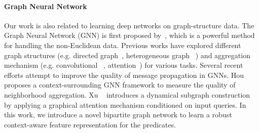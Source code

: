 \vspace{-4mm}
\paragraph{Graph Neural Network}
Our work is also related to learning deep networks on graph-structure data. The Graph Neural Network (GNN) is first proposed by~\cite{scarselli_graph_2009}, which is a powerful method for handling the non-Euclidean data. 
Previous works have explored different graph structures (e.g. directed graph~\cite{kampffmeyer_rethinking_2019}, heterogeneous graph~\cite{zhang_deep_2018, wang_heterogeneous_2019} ) and aggregation mechanism (e.g. convolutional ~\cite{kipf_semi-supervised_2017, hamilton_inductive_2018}, attention~\cite{li_gated_2017, wang_non-local_2017, zhang_latentgnn:_2019, vaswani_attention_2017}) for various tasks. Several recent efforts attempt to improve the quality of message propagation in GNNs.
Hou \etal~\cite{hou_measuring_2020} proposes a context-surrounding GNN framework to measure the quality of neighborhood aggregation.
Xu \etal~\cite{xu_dynamically_2020} introduces a dynamical subgraph construction by applying a graphical attention mechanism conditioned on input queries. 
In this work, we introduce a novel bipartite graph network to learn a robust context-aware feature representation for the predicates.




